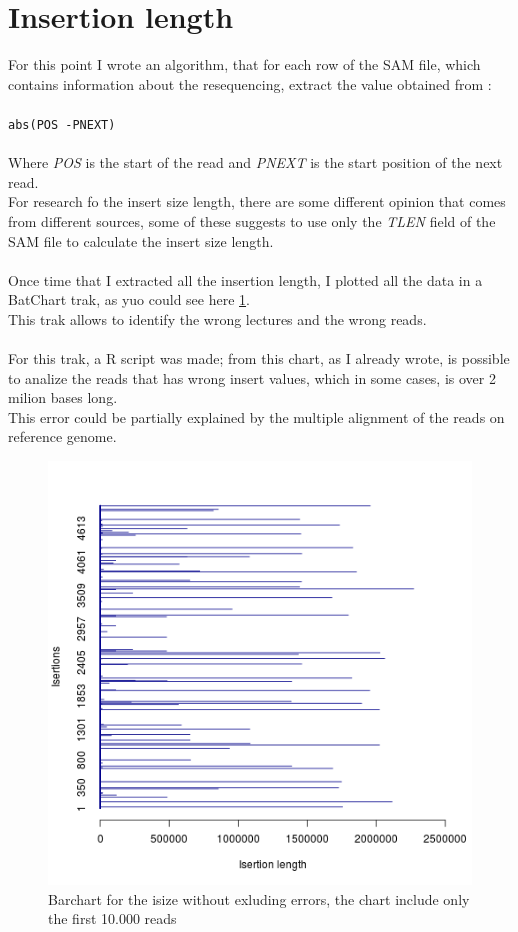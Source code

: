 \section{Insertion length}
For this point I wrote an algorithm, that for each row of the SAM file, which contains information about the resequencing, extract the value obtained from :
\\
\\
\verb|abs(POS -PNEXT)|
\\
\\
Where \emph{POS} is the start of the read and \emph{PNEXT} is the start position of the next read.\\
For research fo the insert size length, there are some different opinion that comes from different sources, some of these suggests to use only the \emph{TLEN} field of the SAM file to calculate the insert size length.
\\\\
Once time that I extracted all the insertion length, I plotted all the data in a BatChart trak, as yuo could see here \ref{fig:1}.\\
This trak allows to identify the wrong lectures and the wrong reads.
\\\\
For this trak, a R script was made; from this chart, as I already wrote, is possible to analize the reads that has wrong insert values, which in some cases, is over 2 milion bases long.\\

This error could be partially explained by the multiple alignment of the reads on reference genome.

 \begin{figure}[H]
				\centering
				\includegraphics[scale=0.8]{immagini/r.png}
				\caption{Barchart for the isize without exluding errors, the chart include only the first 10.000 reads}\label{fig:1}
				\end{figure}

